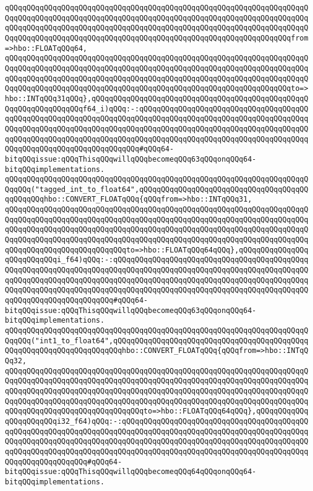 \verb|qQQqqQQqqQQqqQQqqQQqqQQqqQQqqQQqqQQqqQQqqQQqqQQqqQQqqQQqqQQqqQQqqQQqqQQqqQQqqQQqqQQqqQQqqQQqqQQqqQQqqQQqqQQqqQQqqQQqqQQqqQQqqQQqqQQqqQQqqQQqqQQqqQQqqQQqqQQqqQQqqQQqqQQqqQQqqQQqqQQqqQQqqQQqqQQqqQQqqQQqqQQqqQQqqQQqqQQqqQQqqQQqqQQqqQQqqQQqqQQqqQQqqQQqqQQqqQQqqQQqqQQqqQQqqQQqqQQqfrom=>hbo::FLOATqQQq64,|\newline
\verb|qQQqqQQqqQQqqQQqqQQqqQQqqQQqqQQqqQQqqQQqqQQqqQQqqQQqqQQqqQQqqQQqqQQqqQQqqQQqqQQqqQQqqQQqqQQqqQQqqQQqqQQqqQQqqQQqqQQqqQQqqQQqqQQqqQQqqQQqqQQqqQQqqQQqqQQqqQQqqQQqqQQqqQQqqQQqqQQqqQQqqQQqqQQqqQQqqQQqqQQqqQQqqQQqqQQqqQQqqQQqqQQqqQQqqQQqqQQqqQQqqQQqqQQqqQQqqQQqqQQqqQQqqQQqqQQqqQQqto=>hbo::INTqQQq31qQQq},qQQqqQQqqQQqqQQqqQQqqQQqqQQqqQQqqQQqqQQqqQQqqQQqqQQqqQQqqQQqqQQqqQQqf64_i)qQQq:-:qQQqqQQqqQQqqQQqqQQqqQQqqQQqqQQqqQQqqQQqqQQqqQQqqQQqqQQqqQQqqQQqqQQqqQQqqQQqqQQqqQQqqQQqqQQqqQQqqQQqqQQqqQQqqQQqqQQqqQQqqQQqqQQqqQQqqQQqqQQqqQQqqQQqqQQqqQQqqQQqqQQqqQQqqQQqqQQqqQQqqQQqqQQqqQQqqQQqqQQqqQQqqQQqqQQqqQQqqQQqqQQqqQQqqQQqqQQqqQQqqQQqqQQqqQQqqQQqqQQqqQQqqQQqqQQqqQQqqQQq#qQQq64-bitqQQqissue:qQQqThisqQQqwillqQQqbecomeqQQq63qQQqonqQQq64-bitqQQqimplementations.|\newline
\newline
\verb|qQQqqQQqqQQqqQQqqQQqqQQqqQQqqQQqqQQqqQQqqQQqqQQqqQQqqQQqqQQqqQQqqQQqqQQqqQQq("tagged_int_to_float64",qQQqqQQqqQQqqQQqqQQqqQQqqQQqqQQqqQQqqQQqqQQqqQQqhbo::CONVERT_FLOATqQQq{qQQqfrom=>hbo::INTqQQq31,|\newline
\verb|qQQqqQQqqQQqqQQqqQQqqQQqqQQqqQQqqQQqqQQqqQQqqQQqqQQqqQQqqQQqqQQqqQQqqQQqqQQqqQQqqQQqqQQqqQQqqQQqqQQqqQQqqQQqqQQqqQQqqQQqqQQqqQQqqQQqqQQqqQQqqQQqqQQqqQQqqQQqqQQqqQQqqQQqqQQqqQQqqQQqqQQqqQQqqQQqqQQqqQQqqQQqqQQqqQQqqQQqqQQqqQQqqQQqqQQqqQQqqQQqqQQqqQQqqQQqqQQqqQQqqQQqqQQqqQQqqQQqqQQqqQQqqQQqqQQqqQQqqQQqqQQqqQQqto=>hbo::FLOATqQQq64qQQq},qQQqqQQqqQQqqQQqqQQqqQQqqQQqi_f64)qQQq:-:qQQqqQQqqQQqqQQqqQQqqQQqqQQqqQQqqQQqqQQqqQQqqQQqqQQqqQQqqQQqqQQqqQQqqQQqqQQqqQQqqQQqqQQqqQQqqQQqqQQqqQQqqQQqqQQqqQQqqQQqqQQqqQQqqQQqqQQqqQQqqQQqqQQqqQQqqQQqqQQqqQQqqQQqqQQqqQQqqQQqqQQqqQQqqQQqqQQqqQQqqQQqqQQqqQQqqQQqqQQqqQQqqQQqqQQqqQQqqQQqqQQqqQQqqQQqqQQqqQQqqQQqqQQqqQQqqQQqqQQq#qQQq64-bitqQQqissue:qQQqThisqQQqwillqQQqbecomeqQQq63qQQqonqQQq64-bitqQQqimplementations.|\newline
\verb|qQQqqQQqqQQqqQQqqQQqqQQqqQQqqQQqqQQqqQQqqQQqqQQqqQQqqQQqqQQqqQQqqQQqqQQqqQQq("int1_to_float64",qQQqqQQqqQQqqQQqqQQqqQQqqQQqqQQqqQQqqQQqqQQqqQQqqQQqqQQqqQQqqQQqqQQqqQQqhbo::CONVERT_FLOATqQQq{qQQqfrom=>hbo::INTqQQq32,|\newline
\verb|qQQqqQQqqQQqqQQqqQQqqQQqqQQqqQQqqQQqqQQqqQQqqQQqqQQqqQQqqQQqqQQqqQQqqQQqqQQqqQQqqQQqqQQqqQQqqQQqqQQqqQQqqQQqqQQqqQQqqQQqqQQqqQQqqQQqqQQqqQQqqQQqqQQqqQQqqQQqqQQqqQQqqQQqqQQqqQQqqQQqqQQqqQQqqQQqqQQqqQQqqQQqqQQqqQQqqQQqqQQqqQQqqQQqqQQqqQQqqQQqqQQqqQQqqQQqqQQqqQQqqQQqqQQqqQQqqQQqqQQqqQQqqQQqqQQqqQQqqQQqqQQqqQQqqQQqto=>hbo::FLOATqQQq64qQQq},qQQqqQQqqQQqqQQqqQQqqQQqi32_f64)qQQq:-:qQQqqQQqqQQqqQQqqQQqqQQqqQQqqQQqqQQqqQQqqQQqqQQqqQQqqQQqqQQqqQQqqQQqqQQqqQQqqQQqqQQqqQQqqQQqqQQqqQQqqQQqqQQqqQQqqQQqqQQqqQQqqQQqqQQqqQQqqQQqqQQqqQQqqQQqqQQqqQQqqQQqqQQqqQQqqQQqqQQqqQQqqQQqqQQqqQQqqQQqqQQqqQQqqQQqqQQqqQQqqQQqqQQqqQQqqQQqqQQqqQQqqQQqqQQqqQQqqQQqqQQqqQQqqQQq#qQQq64-bitqQQqissue:qQQqThisqQQqwillqQQqbecomeqQQq64qQQqonqQQq64-bitqQQqimplementations.|\newline
